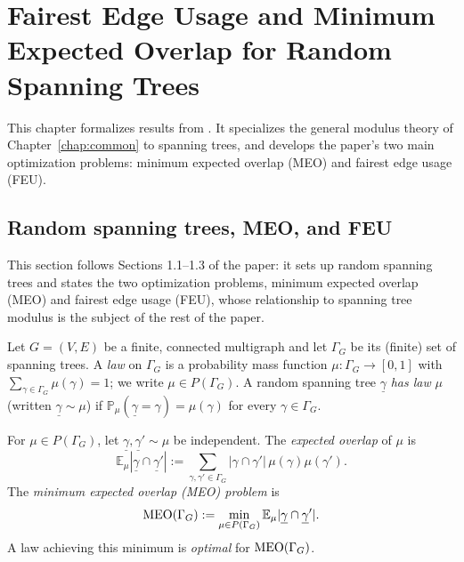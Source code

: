 \chapter{Fairest Edge Usage and Minimum Expected Overlap for Random Spanning Trees}
\label{chap:feu}

This chapter formalizes results from \feupaperref{}. It specializes the general
modulus theory of Chapter~\ref{chap:common} to spanning trees, and develops the
paper's two main optimization problems: minimum expected overlap (MEO) and
fairest edge usage (FEU).

\section{Random spanning trees, MEO, and FEU}

This section follows Sections 1.1--1.3 of the paper: it sets up random spanning
trees and states the two optimization problems, minimum expected overlap
(MEO) and fairest edge usage (FEU), whose relationship to spanning tree
modulus is the subject of the rest of the paper.

\begin{definition}
\label{def:spanning-tree-law}
Let $G = (V, E)$ be a finite, connected multigraph and let $\Gamma_G$ be its
(finite) set of spanning trees. A \emph{law} on $\Gamma_G$ is a probability
mass function $\mu \colon \Gamma_G \to [0,1]$ with $\sum_{\gamma \in \Gamma_G}
\mu(\gamma) = 1$; we write $\mu \in P(\Gamma_G)$. A random spanning tree
$\underline\gamma$ \emph{has law} $\mu$ (written $\underline\gamma \sim \mu$)
if $\mathbb P_\mu(\underline\gamma = \gamma) = \mu(\gamma)$ for every $\gamma
\in \Gamma_G$.
\end{definition}

\begin{definition}
\label{def:meo}
For $\mu \in P(\Gamma_G)$, let $\underline\gamma, \underline\gamma' \sim \mu$
be independent. The \emph{expected overlap} of $\mu$ is
\[
  \mathbb E_\mu |\underline\gamma \cap \underline\gamma'|
  := \sum_{\gamma, \gamma' \in \Gamma_G} |\gamma \cap \gamma'| \, \mu(\gamma) \mu(\gamma').
\]
The \emph{minimum expected overlap (MEO) problem} is
\[
  \operatorname{MEO}(\Gamma_G) := \min_{\mu \in P(\Gamma_G)} \mathbb E_\mu |\underline\gamma \cap \underline\gamma'|.
\]
A law achieving this minimum is \emph{optimal} for $\operatorname{MEO}(\Gamma_G)$.
\end{definition}

